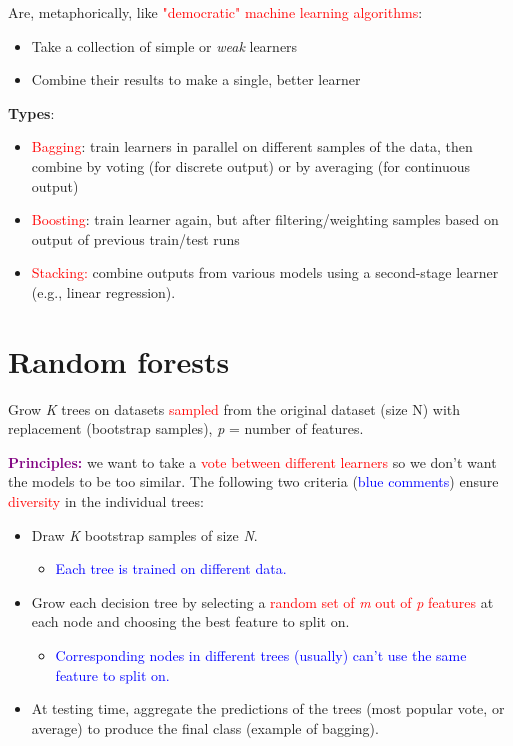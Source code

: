\documentclass[11pt]{article}
\begin{document}
Are, metaphorically, like \textcolor{red}{"democratic" machine learning algorithms}:
\begin{itemize}
	\item Take a collection of simple or \textit{weak} learners
	\item Combine their results to make a single, better learner
\end{itemize}
\textbf{Types}:
\begin{itemize}
	\item \textcolor{red}{Bagging}: train learners in parallel on different samples of the data, then combine by voting (for discrete output) or by averaging (for continuous output)
	\item \textcolor{red}{Boosting}: train learner again, but after filtering/weighting samples based on output of previous train/test runs
	\item \textcolor{red}{Stacking:} combine outputs from various models using a second-stage learner (e.g., linear regression).
\end{itemize}

\section*{Random forests}

Grow \textit{K} trees on datasets \textcolor{red}{sampled} from the original dataset (size N) with replacement (bootstrap samples), \textit{p} = number of features. 

\textcolor{purple}{\textbf{Principles:}} we want to take a \textcolor{red}{vote between different learners} so we don't want the models to be too similar. The following two criteria (\textcolor{blue}{blue comments}) ensure \textcolor{red}{diversity} in the individual trees:

\begin{itemize}
	\item Draw \textit{K} bootstrap samples of size \textit{N}.
		\begin{itemize}
			\item \textcolor{blue}{Each tree is trained on different data.}
		\end{itemize}
	\item Grow each decision tree by selecting a \textcolor{red}{random set of \textit{m} out of \textit{p} features} at each node and choosing the best feature to split on.
		\begin{itemize}
			\item \textcolor{blue}{Corresponding nodes in different trees (usually) can't use the same feature to split on.}
		\end{itemize}
	\item At testing time, aggregate the predictions of the trees (most popular vote, or average) to produce the final class (example of bagging).
\end{itemize}
\end{document}

